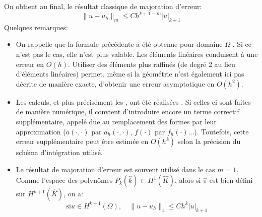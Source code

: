 On obtient au final, le résultat classique de majoration d'erreur:
\begin{equation}
\|u-u_h\|_m\le C h^{k+1-m} |u|_{k+1}
\end{equation}
Quelques remarques:
\begin{itemize}
  \item On rappelle que la formule précédente a été obtenue pour domaine $\Omega$
	. Si ce n'est pas le cas, elle n'est plus valable.
	Les éléments linéaires conduisent à une erreur en $O(h)$.
	Utiliser des éléments plus raffinés (de degré 2 au lieu d'éléments linéaires) permet,
	même si la géométrie n'est également ici pas décrite de manière exacte, d'obtenir une
	erreur asymptotique en $O(h^2)$.
  \item Les calculs, et plus précisément les , ont été réalisées
	.
	Si celles-ci sont faites de manière numérique, il convient d'introduire encore un
	terme correctif supplémentaire, appelé  due au remplacement des
	formes par leur approximation ($a(\cdot,\cdot)$ par $a_h(\cdot,\cdot)$, $f(\cdot)$ par $f_h(\cdot)$...). Toutefois, cette
	erreur supplémentaire peut être estimée en $O(h^k)$ selon la précision du schéma
	d'intégration utilisé.
  \item Le résultat de majoration d'erreur est souvent utilisé dans le cas $m=1$.
	Comme l'espace des polynômes $P_k(\hat{k})\subset H^1(\hat{K})$, alors si
	$\hat{\pi}$ est bien défini sur $H^{k+1}(\hat{K})$, on a:
	\begin{equation}
	\text{si} u\in H^{k+1}(\Omega), \quad \|u-u_h\|_1\le C h^k |u|_{k+1}
	\end{equation}
\end{itemize} 